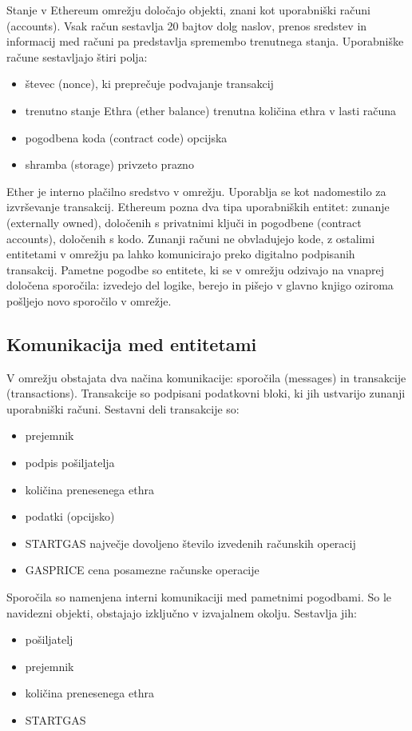 \documentclass[a4paper, 12pt]{book}
\begin{document}
Stanje v Ethereum omrežju določajo objekti, znani kot uporabniški računi (accounts).
Vsak račun sestavlja 20 bajtov dolg naslov, prenos sredstev in informacij med računi pa predstavlja spremembo trenutnega stanja.
Uporabniške račune sestavljajo štiri polja:
\begin{itemize}
\item števec (nonce), ki preprečuje podvajanje transakcij
\item trenutno stanje Ethra (ether balance) trenutna količina ethra v lasti računa
\item pogodbena koda (contract code) opcijska
\item shramba (storage) privzeto prazno
\end{itemize}

Ether je interno plačilno sredstvo v omrežju.
Uporablja se kot nadomestilo za izvrševanje transakcij.
Ethereum pozna dva tipa uporabniških entitet: zunanje (externally owned), določenih s privatnimi ključi in pogodbene (contract accounts), določenih s kodo.
Zunanji računi ne obvladujejo kode, z ostalimi entitetami v omrežju pa lahko komunicirajo preko digitalno podpisanih transakcij.
Pametne pogodbe so entitete, ki se v omrežju odzivajo na vnaprej določena sporočila: izvedejo del logike, berejo in pišejo v glavno knjigo oziroma pošljejo novo sporočilo v omrežje.

\subsection{Komunikacija med entitetami}
V omrežju obstajata dva načina komunikacije: sporočila (messages) in transakcije (transactions).
Transakcije so podpisani podatkovni bloki, ki jih ustvarijo zunanji uporabniški računi.
Sestavni deli transakcije so:
\begin{itemize}
	\item prejemnik
	\item podpis pošiljatelja
	\item količina prenesenega ethra
	\item podatki (opcijsko)
	\item STARTGAS največje dovoljeno število izvedenih računskih operacij
	\item GASPRICE cena posamezne računske operacije
\end{itemize}

Sporočila so namenjena interni komunikaciji med pametnimi pogodbami.
So le navidezni objekti, obstajajo izključno v izvajalnem okolju.
Sestavlja jih:
\begin{itemize}
	\item pošiljatelj
	\item prejemnik
	\item količina prenesenega ethra
	\item STARTGAS
\end{itemize}
\cite{ethereumWhitepaper}
\end{document}
